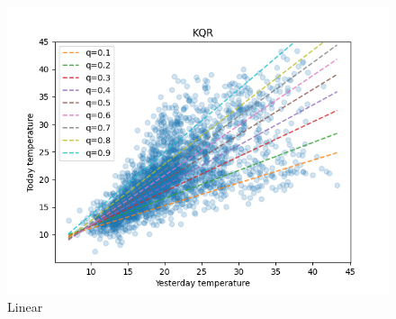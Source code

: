   \begin{figure}[ht] 
    \label{ fig8} 
    \begin{minipage}[b]{0.5\linewidth}
      \centering
      \includegraphics[width=1.0\textwidth]{images/melbourne_linear_kernel_quantile_regression.png}
        \caption{Linear} 
        

\end{minipage}
\end{figure}

